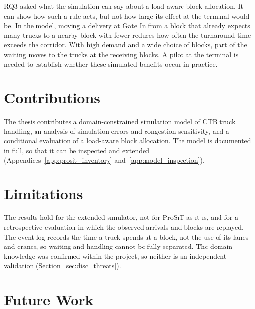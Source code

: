 RQ3 asked what the simulation can say about a load-aware block allocation. It can show
how such a rule acts, but not how large its effect at the terminal would be. In the
model, moving a delivery at Gate In from a block that already expects many trucks to a
nearby block with fewer reduces how often the turnaround time exceeds the corridor.
With high demand and a wide choice of blocks, part of the waiting moves to the trucks
at the receiving blocks. A pilot at the terminal is needed to establish whether these simulated benefits occur
in practice.


\section{Contributions}
\label{sec:concl_contributions}

The thesis contributes a domain-constrained simulation model of CTB truck handling, an
analysis of simulation errors and congestion sensitivity, and a conditional evaluation
of a load-aware block allocation. The model is documented in full, so that it can be
inspected and extended (Appendices~\ref{app:prosit_inventory}
and~\ref{app:model_inspection}).

\section{Limitations}
\label{sec:concl_limitations}

The results hold for the extended simulator, not for ProSiT as it is, and for a
retrospective evaluation in which the observed arrivals and blocks are replayed. The
event log records the time a truck spends at a block, not the use of its lanes and
cranes, so waiting and handling cannot be fully separated. The domain knowledge was
confirmed within the project, so neither is
an independent validation (Section~\ref{sec:disc_threats}).

\section{Future Work}
\label{sec:future_work}

